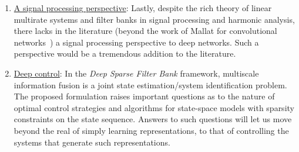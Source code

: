 \documentclass[12pt]{article}
\renewenvironment{itemize}{
  \begin{list}{}{
    \setlength{\itemsep}{0.25em}
    \setlength{\parskip}{0pt}
    \setlength{\parsep}{0.25em}
  }
}{
  \end{list}
}
\begin{document}
\begin{enumerate}
	\item \underline{A signal processing perspective}: Lastly, despite the rich theory of linear multirate systems and filter banks in signal processing and harmonic analysis, there lacks in the literature (beyond the work of Mallat for convolutional networks~\cite{bruna2013invariant}) a signal processing perspective to deep networks. Such a perspective would be a tremendous addition to the literature.
	
	\item \underline{Deep control}: In the \emph{Deep Sparse Filter Bank} framework, multiscale information fusion is a joint state estimation/system identification problem. The proposed formulation raises important questions as to the nature of optimal control strategies and algorithms for state-space models with sparsity constraints on the state sequence. Answers to such questions will let us move beyond the real of simply learning representations, to that of controlling the systems that generate such representations. 
	
\end{enumerate}

%

%


%
%
%
%
\end{document}
